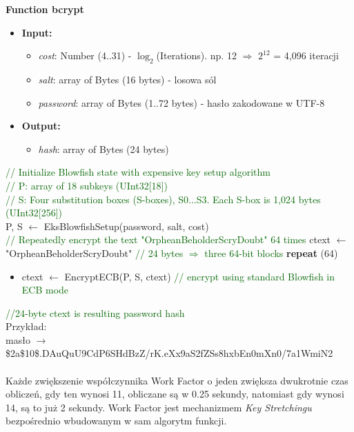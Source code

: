 \documentclass[12pt, letterpaper]{article}
\begin{document}
\textbf{Function bcrypt}
\begin{itemize}
   \item \textbf{Input:}
   \begin{itemize}
      \item \textit{cost}: Number (4..31) - $\log_{2}$(Iterations). np. 12 $\Rightarrow$ $2^{12}$ = 4,096 iteracji
      \item \textit{salt}: array of Bytes (16 bytes) - losowa sól
      \item \textit{password}: array of Bytes (1..72 bytes) - hasło zakodowane w UTF-8
   \end{itemize}
   \item \textbf{Output:}
   \begin{itemize}
      \item \textit{hash}: array of Bytes (24 bytes)
   \end{itemize}
\end{itemize}
\textcolor{darkgreen}{// Initialize Blowfish state with expensive key setup algorithm}
\\
\textcolor{darkgreen}{// P: array of 18 subkeys (UInt32[18])}
\\
\textcolor{darkgreen}{// S: Four substitution boxes (S-boxes), S0...S3. Each S-box is 1,024 bytes (UInt32[256])}
\\P, S $\leftarrow$ EksBlowfishSetup(password, salt, cost)
\\
\textcolor{darkgreen}{// Repeatedly encrypt the text "OrpheanBeholderScryDoubt" 64 times}
ctext $\leftarrow$ "OrpheanBeholderScryDoubt" \textcolor{darkgreen}{// 24 bytes $\Rightarrow$ three 64-bit blocks}
\textbf{repeat} (64)
\begin{itemize}
   \item ctext $\leftarrow$ EncryptECB(P, S, ctext) \textcolor{darkgreen}{// encrypt using standard Blowfish in ECB mode}
\end{itemize}
\textcolor{darkgreen}{//24-byte ctext is resulting password hash}\\
Przykład:
\\ masło $\rightarrow$ \$2a\$10\$.DAuQuU9CdP6SHdBzZ/rK.eXx9aS2fZSs8hxbEn0mXn0/7a1WmiN2
\\
\\
Każde zwiększenie współczynnika Work Factor o jeden zwiększa dwukrotnie czas obliczeń, gdy ten wynosi 11, obliczane są w 0.25 sekundy, natomiast gdy wynosi 14, są to już 2 sekundy.
Work Factor jest mechanizmem \textit{Key Stretchingu} bezpośrednio wbudowanym w sam algorytm funkcji.
\newpage
\end{document}
